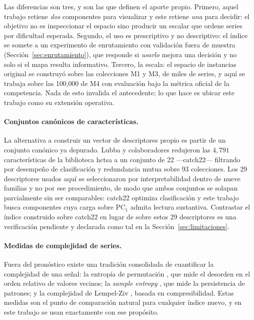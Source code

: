 Las diferencias son tres, y son las que definen el aporte propio. Primero, aquel trabajo
retiene \emph{dos} componentes para visualizar y este retiene \emph{una} para decidir:
el objetivo no es inspeccionar el espacio sino producir un escalar que ordene series por
dificultad esperada. Segundo, el uso es prescriptivo y no descriptivo: el índice se
somete a un experimento de enrutamiento con validación fuera de muestra
(Sección~\ref{sec:enrutamiento}), que responde si \emph{usarlo} mejora una decisión y no
solo si el mapa resulta informativo. Tercero, la escala: el espacio de instancias
original se construyó sobre las colecciones M1 y M3, de miles de series, y aquí se
trabaja sobre las 100{,}000 de M4 con evaluación bajo la métrica oficial de la
competencia. Nada de esto invalida el antecedente; lo que hace es ubicar este trabajo
como su extensión operativa.

\paragraph{Conjuntos canónicos de características.} La alternativa a construir un
vector de descriptores propio es partir de un conjunto canónico ya depurado. Lubba y
colaboradores \cite{lubba2019} redujeron las $4{,}791$ características de la biblioteca
hctsa \cite{fulcher2017} a un conjunto de 22 ---catch22--- filtrando por desempeño de
clasificación y redundancia mutua sobre 93 colecciones. Los 29 descriptores usados aquí
se seleccionaron por interpretabilidad dentro de nueve familias y no por ese
procedimiento, de modo que ambos conjuntos se solapan parcialmente sin ser
comparables: catch22 optimiza clasificación y este trabajo busca componentes cuya carga
sobre $\mathrm{PC}_1$ admita lectura sustantiva. Contrastar el índice construido sobre
catch22 en lugar de sobre estos 29 descriptores es una verificación pendiente y
declarada como tal en la Sección~\ref{sec:limitaciones}.

\paragraph{Medidas de complejidad de series.} Fuera del pronóstico existe una
tradición consolidada de cuantificar la complejidad de una señal: la entropía de
permutación \cite{bandt2002}, que mide el desorden en el orden relativo de valores
vecinos; la \emph{sample entropy} \cite{richman2000}, que mide la persistencia de
patrones; y la complejidad de Lempel-Ziv \cite{lempel1976}, basada en
compresibilidad. Estas medidas son el punto de comparación natural para cualquier
índice nuevo, y en este trabajo se usan exactamente con ese propósito.

